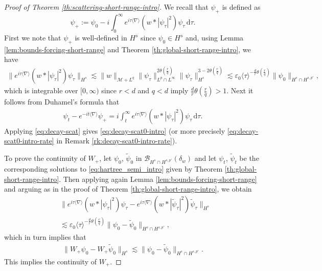 \documentclass[12pt]{article}
\theoremstyle{plain}
\newcommand{\meas}{\mathcal{M}}
\begin{document}
	
	\begin{proof}[Proof of Theorem \ref{th:scattering-short-range-intro}]
	We recall that $\psi_+$ is defined as 
	\begin{equation*}
	    	\psi_+ := \psi_0 - i \int_0^\infty e^{i\tau\langle\nabla\rangle} (w * |\psi_\tau|^2)\psi_\tau\, \mathrm{d}\tau.
	\end{equation*}
		First we note that $\psi_+$ is well-defined in $H^s$ since $\psi_0\in H^s$ and, using Lemma \ref{lem:bounds-forcing-short-range} and Theorem \ref{th:global-short-range-intro}, we have
		\begin{align}\label{eq:decay-scat}
		 \|e^{i\tau\langle\nabla\rangle}(w * |\psi_\tau|^2)\psi_\tau\|_{H^s}\lesssim \|w\|_{\meas+L^{q}} \|\psi_\tau\|_{L^{p}\cap L^\infty}^{2 \theta(\frac{r}{q})} \|\psi_\tau\|_{H^{s}}^{3-2 \theta(\frac{r}{q})}\lesssim\varepsilon_0\langle \tau\rangle^{-\frac dr\theta (\frac{r}{q})}\|\psi_0\|_{H^s\cap H^{s,p'}},
		\end{align}	
		which is integrable over $[0,\infty)$ since $r<d$ and $q<d$ imply $\frac{d}{r}\theta (\frac{r}{q})>1$.
		Next it follows from Duhamel's formula that
		\begin{align*}
			\psi_t - e^{-it\langle\nabla\rangle} \psi_+=i\int_t^\infty e^{i\tau\langle\nabla\rangle} (w * |\psi_\tau|^2)\psi_\tau\, \mathrm{d}\tau.
		\end{align*}
		Applying \eqref{eq:decay-scat} gives \eqref{eq:decay-scat0-intro} (or more precisely \eqref{eq:decay-scat0-intro-rate} in Remark \ref{rk:decay-scat0-intro-rate}). 
		
		To prove the continuity of $W_+$, let $\psi_0$, $\tilde\psi_0$ in $\mathcal{B}_{H^s\cap H^{s,p'}}(\delta_w)$ and let $\psi_t$, $\tilde\psi_t$ be the corresponding solutions to \eqref{eq:hartree_semi_intro} given by Theorem \ref{th:global-short-range-intro}. Then applying again Lemma \ref{lem:bounds-forcing-short-range} and arguing as in the proof of Theorem \ref{th:global-short-range-intro}, we obtain
		\begin{align*}
		& \big\|e^{i\tau\langle\nabla\rangle}(w * |\psi_\tau|^2)\psi_\tau-e^{i\tau\langle\nabla\rangle}(w * |\tilde\psi_\tau|^2)\tilde\psi_\tau\big\|_{H^s}\\
		&\lesssim\varepsilon_0\langle \tau\rangle^{-\frac{d}{r}\theta(\frac{r}{q}) }\|\psi_0-\tilde\psi_0\|_{H^s\cap H^{s,p'}},
		\end{align*}
		which in turn implies that
		\begin{align*}
		    \|W_+\psi_0-W_+\tilde\psi_0\|_{H^s}\lesssim\|\psi_0-\tilde\psi_0\|_{H^s\cap H^{s,p'}}.
		\end{align*}
		This implies the continuity of $W_+$.
	\end{proof}
\end{document}
